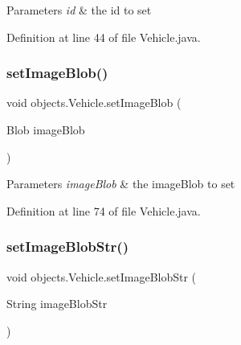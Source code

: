 \begin{DoxyParams}{Parameters}
{\em id} & the id to set \\
\hline
\end{DoxyParams}


Definition at line 44 of file Vehicle.\+java.


\begin{DoxyCode}{0}

\end{DoxyCode}
\mbox{\label{classobjects_1_1_vehicle_ad0d4618125f8f685b635d0239c8106e8}} 
\subsubsection{\texorpdfstring{setImageBlob()}{setImageBlob()}}
{\footnotesize\ttfamily void objects.\+Vehicle.\+set\+Image\+Blob (\begin{DoxyParamCaption}\item[{Blob}]{image\+Blob }\end{DoxyParamCaption})}


\begin{DoxyParams}{Parameters}
{\em image\+Blob} & the image\+Blob to set \\
\hline
\end{DoxyParams}


Definition at line 74 of file Vehicle.\+java.


\begin{DoxyCode}{0}

\end{DoxyCode}
\mbox{\label{classobjects_1_1_vehicle_a12f770c23ef3fe8fa8e019c27c1eb3a8}} 
\subsubsection{\texorpdfstring{setImageBlobStr()}{setImageBlobStr()}}
{\footnotesize\ttfamily void objects.\+Vehicle.\+set\+Image\+Blob\+Str (\begin{DoxyParamCaption}\item[{String}]{image\+Blob\+Str }\end{DoxyParamCaption})}


